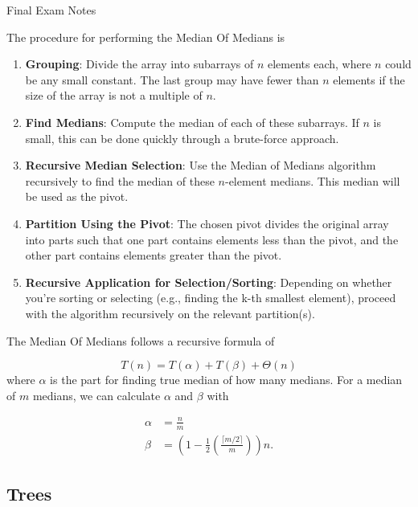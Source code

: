 \begin{examnotes}{Final Exam Notes}
    \begin{highlight}
        The procedure for performing the Median Of Medians is

        \begin{enumerate}
            \item \textbf{Grouping}: Divide the array into subarrays of $n$ elements each, where $n$ could be any small constant. The last group may have fewer than $n$ elements if the size of the array 
            is not a multiple of $n$.
            \item \textbf{Find Medians}: Compute the median of each of these subarrays. If $n$ is small, this can be done quickly through a brute-force approach.
            \item \textbf{Recursive Median Selection}: Use the Median of Medians algorithm recursively to find the median of these $n$-element medians. This median will be used as the pivot.
            \item \textbf{Partition Using the Pivot}: The chosen pivot divides the original array into parts such that one part contains elements less than the pivot, and the other part contains elements 
            greater than the pivot.
            \item \textbf{Recursive Application for Selection/Sorting}: Depending on whether you're sorting or selecting (e.g., finding the k-th smallest element), proceed with the algorithm recursively 
            on the relevant partition(s).
        \end{enumerate}
        The Median Of Medians follows a recursive formula of 

        \begin{equation*}
            T(n) = T(\alpha) + T(\beta) + \Theta(n)
        \end{equation*}
        where $\alpha$ is the part for finding true median of how many medians. For a median of $m$ medians, we can calculate $\alpha$ and $\beta$ with

        \begin{align*}
            \alpha & = \frac{n}{m} \\
            \beta & = \left(1 - \frac{1}{2} \left(\frac{\lceil m / 2 \rceil}{m}\right)\right)n.
        \end{align*}
    \end{highlight}

    \subsection*{Trees}


\end{examnotes}
